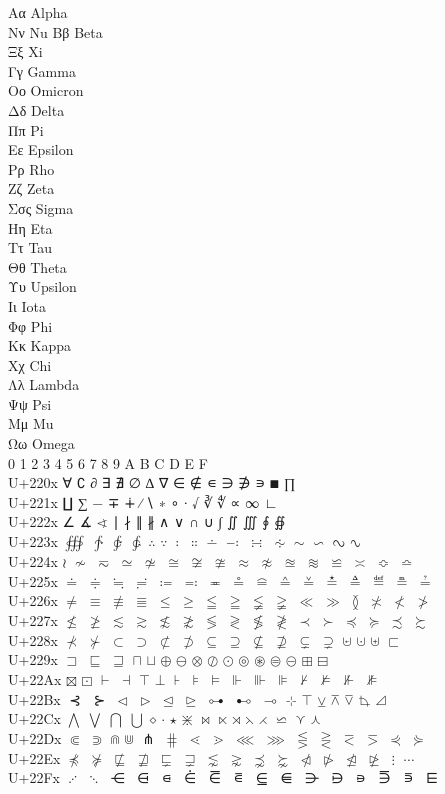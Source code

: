 \documentclass{article}
\begin{document}
\par
Αα  Alpha\\ Νν  Nu 
Ββ  Beta\\  Ξξ  Xi\\
Γγ  Gamma\\ Οο  Omicron\\
Δδ  Delta\\ Ππ  Pi\\
Εε  Epsilon\\ Ρρ  Rho\\
Ζζ  Zeta\\  Σσς Sigma\\
Ηη  Eta\\ Ττ  Tau\\
Θθ  Theta\\ Υυ  Upsilon\\
Ιι  Iota\\  Φφ  Phi\\
Κκ  Kappa\\ Χχ  Chi\\
Λλ  Lambda\\  Ψψ  Psi\\
Μμ  Mu\\  Ωω  Omega\\

 0 1 2 3 4 5 6 7 8 9 A B C D E F\\
U+220x  ∀ ∁ ∂ ∃ ∄ ∅ ∆ ∇ ∈ ∉ ∊ ∋ ∌ ∍ $∎$ ∏\\
U+221x  ∐ ∑ − ∓ ∔ ∕ ∖ ∗ ∘ ∙ √ ∛ ∜ ∝ ∞ ∟\\
U+222x  ∠ ∡ ∢ ∣ ∤ ∥ ∦ ∧ ∨ ∩ ∪ ∫ ∬ ∭ ∮ ∯\\
U+223x  $∰$ $∱$ $∲$ $∳$ $∴$ $∵$ $∶$ $∷$ $∸$ $∹$ $∺$ $∻$ $∼$ $∽$ $∾$ $∿$\\
U+224x  $≀$ $≁$ $≂$ $≃$ $≄$ $≅$ $≆$ $≇$ $≈$ $≉$ $≊$ $≋$ $≌$ $≍$ $≎$ $≏$\\
U+225x  $≐$ $≑$ $≒$ $≓$ $≔$ $≕$ $≖$ $≗$ $≘$ $≙$ $≚$ $≛$ $≜$ $≝$ $≞$ $≟$\\
U+226x  $≠$ $≡$ $≢$ $≣$ $≤$ $≥$ $≦$ $≧$ $≨$ $≩$ $≪$ $≫$ $≬$ $≭$ $≮$ $≯$\\
U+227x  $≰$ $≱$ $≲$ $≳$ $≴$ $≵$ $≶$ $≷$ $≸$ $≹$ $≺$ $≻$ $≼$ $≽$ $≾$ $≿$\\
U+228x  $⊀$ $⊁$ $⊂$ $⊃$ $⊄$ $⊅$ $⊆$ $⊇$ $⊈$ $⊉$ $⊊$ $⊋$ $⊌$ $⊍$ $⊎$ $⊏$\\
U+229x  $⊐$ $⊑$ $⊒$ $⊓$ $⊔$ $⊕$ $⊖$ $⊗$ $⊘$ $⊙$ $⊚$ $⊛$ $⊜$ $⊝$ $⊞$ $⊟$\\
U+22Ax  $⊠$ $⊡$ $⊢$ $⊣$ $⊤$ $⊥$ $⊦$ $⊧$ $⊨$ $⊩$ $⊪$ $⊫$ $⊬$ $⊭$ $⊮$ $⊯$\\
U+22Bx  $⊰$ $⊱$ $⊲$ $⊳$ $⊴$ $⊵$ $⊶$ $⊷$ $⊸$ $⊹$ $⊺$ $⊻$ $⊼$ $⊽$ $⊾$ $⊿$\\
U+22Cx  $⋀$ $⋁$ $⋂$ $⋃$ $⋄$ $⋅$ $⋆$ $⋇$ $⋈$ $⋉$ $⋊$ $⋋$ $⋌$ $⋍$ $⋎$ $⋏$\\
U+22Dx  $⋐$ $⋑$ $⋒$ $⋓$ $⋔$ $⋕$ $⋖$ $⋗$ $⋘$ $⋙$ $⋚$ $⋛$ $⋜$ $⋝$ $⋞$ $⋟$\\
U+22Ex  $⋠$ $⋡$ $⋢$ $⋣$ $⋤$ $⋥$ $⋦$ $⋧$ $⋨$ $⋩$ $⋪$ $⋫$ $⋬$ $⋭$ $⋮$ $⋯$\\
U+22Fx  $⋰$ $⋱$ $⋲$ $⋳$ $⋴$ $⋵$ $⋶$ $⋷$ $⋸$ $⋹$ $⋺$ $⋻$ $⋼$ $⋽$ $⋾$ $⋿$\\
\end{document}
